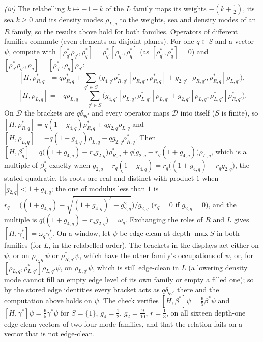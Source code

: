 \emph{(iv)} The relabelling $k \mapsto -1 - k$ of the $L$ family maps its weights $-(k + \tfrac12)$, its sea $k \ge 0$ and its density modes $\rho_{L, q}$ to the weights, sea and density modes of an $R$ family, so the results above hold for both families. Operators of different families commute (even elements on disjoint planes). For one $q \in S$ and a vector $\psi$, compute with $[\rho^{*}_{q'}\rho_{q'}, \rho_{q}^{*}] = \rho_{q'}^{*}[\rho_{q'}, \rho_{q}^{*}]$ (as $[\rho_{q'}^{*}, \rho_{q}^{*}] = 0$) and $[\rho_{q'}^{*}\rho_{q'}, \rho_{q}] = [\rho_{q'}^{*}, \rho_{q}]\rho_{q'}$:
\[
[H, \rho_{R, q}^{*}] = q\rho_{R, q}^{*} + \sum_{q' \in S}\bigl(g_{4, q'}\rho_{R, q'}^{*}[\rho_{R, q'}, \rho_{R, q}^{*}] + g_{2, q'}[\rho_{R, q'}, \rho_{R, q}^{*}]\rho_{L, q'}\bigr),
\]
\[
[H, \rho_{L, q}] = -q\rho_{L, q} - \sum_{q' \in S}\bigl(g_{4, q'}[\rho_{L, q}, \rho_{L, q'}^{*}]\rho_{L, q'} + g_{2, q'}[\rho_{L, q}, \rho_{L, q'}^{*}]\rho_{R, q'}^{*}\bigr).
\]
On $\mathcal{D}$ the brackets are $q\delta_{qq'}$ and every operator maps $\mathcal{D}$ into itself ($S$ is finite), so $[H, \rho_{R, q}^{*}] = q(1 + g_{4, q})\rho_{R, q}^{*} + qg_{2, q}\rho_{L, q}$ and $[H, \rho_{L, q}] = -q(1 + g_{4, q})\rho_{L, q} - qg_{2, q}\rho_{R, q}^{*}$. Then $[H, \beta_{q}^{*}] = q\bigl((1 + g_{4, q}) - r_{q}g_{2, q}\bigr)\rho_{R, q}^{*} + q\bigl(g_{2, q} - r_{q}(1 + g_{4, q})\bigr)\rho_{L, q}$, which is a multiple of $\beta_{q}^{*}$ exactly when $g_{2, q} - r_{q}(1 + g_{4, q}) = r_{q}\bigl((1 + g_{4, q}) - r_{q}g_{2, q}\bigr)$, the stated quadratic. Its roots are real and distinct with product $1$ when $|g_{2, q}| < 1 + g_{4, q}$; the one of modulus less than $1$ is $r_{q} = \bigl((1 + g_{4, q}) - \sqrt{(1 + g_{4, q})^{2} - g_{2, q}^{2}}\bigr)/g_{2, q}$ ($r_{q} = 0$ if $g_{2, q} = 0$), and the multiple is $q\bigl((1 + g_{4, q}) - r_{q}g_{2, q}\bigr) = \omega_{q}$. Exchanging the roles of $R$ and $L$ gives $[H, \gamma_{q}^{*}] = \omega_{q}\gamma_{q}^{*}$. On a window, let $\psi$ be edge-clean at depth $\max S$ in both families (for $L$, in the relabelled order). The brackets in the displays act either on $\psi$, or on $\rho_{L, q'}\psi$ or $\rho_{R, q'}^{*}\psi$, which have the other family's occupations of $\psi$, or, for $[\rho_{L, q}, \rho_{L, q'}^{*}]\rho_{L, q'}\psi$, on $\rho_{L, q'}\psi$, which is still edge-clean in $L$ (a lowering density mode cannot fill an empty edge level of its own family or empty a filled one); so by the stored edge identities every bracket acts as $q\delta_{qq'}$ there and the computation above holds on $\psi$. The check verifies $[H, \beta^{*}]\psi = \tfrac65\beta^{*}\psi$ and $[H, \gamma^{*}]\psi = \tfrac65\gamma^{*}\psi$ for $S = \{1\}$, $g_{4} = \tfrac12$, $g_{2} = \tfrac{9}{10}$, $r = \tfrac13$, on all sixteen depth-one edge-clean vectors of two four-mode families, and that the relation fails on a vector that is not edge-clean.
